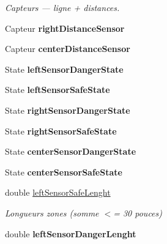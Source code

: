 \begin{DoxyCompactItemize}
\begin{DoxyCompactList}\small\item\em Capteurs --- ligne + distances. \end{DoxyCompactList}\item 
\hypertarget{struct_profil_a0524c41ae25eb77733fc12494c9f7235}{Capteur {\bfseries right\-Distance\-Sensor}}\label{struct_profil_a0524c41ae25eb77733fc12494c9f7235}

\item 
\hypertarget{struct_profil_a87e765da51ec609b0cbf07c4a5536970}{Capteur {\bfseries center\-Distance\-Sensor}}\label{struct_profil_a87e765da51ec609b0cbf07c4a5536970}

\item 
\hypertarget{struct_profil_aee228d9fabd52ffba5ad18ed3bf02a45}{State {\bfseries left\-Sensor\-Danger\-State}}\label{struct_profil_aee228d9fabd52ffba5ad18ed3bf02a45}

\item 
\hypertarget{struct_profil_a6f95792b108edf661b9c0a63e1a48dde}{State {\bfseries left\-Sensor\-Safe\-State}}\label{struct_profil_a6f95792b108edf661b9c0a63e1a48dde}

\item 
\hypertarget{struct_profil_a794caf2ebdfd06d72dff4e91deccacf3}{State {\bfseries right\-Sensor\-Danger\-State}}\label{struct_profil_a794caf2ebdfd06d72dff4e91deccacf3}

\item 
\hypertarget{struct_profil_ab00e6bbb9b540fed892f202a8d329c2e}{State {\bfseries right\-Sensor\-Safe\-State}}\label{struct_profil_ab00e6bbb9b540fed892f202a8d329c2e}

\item 
\hypertarget{struct_profil_a45c033cd53138b180bc2e87ac3335227}{State {\bfseries center\-Sensor\-Danger\-State}}\label{struct_profil_a45c033cd53138b180bc2e87ac3335227}

\item 
\hypertarget{struct_profil_a000e404d5dc457e2c847081f3e29f8c7}{State {\bfseries center\-Sensor\-Safe\-State}}\label{struct_profil_a000e404d5dc457e2c847081f3e29f8c7}

\item 
\hypertarget{struct_profil_a8e4aa00ebc713cbe164f84226d55e493}{double \hyperlink{struct_profil_a8e4aa00ebc713cbe164f84226d55e493}{left\-Sensor\-Safe\-Lenght}}\label{struct_profil_a8e4aa00ebc713cbe164f84226d55e493}

\begin{DoxyCompactList}\small\item\em Longueurs zones (somme $<$= 30 pouces) \end{DoxyCompactList}\item 
\hypertarget{struct_profil_a8bc1ccd7e3c2eb58967da206c28005be}{double {\bfseries left\-Sensor\-Danger\-Lenght}}\label{struct_profil_a8bc1ccd7e3c2eb58967da206c28005be}


\end{DoxyCompactItemize}
